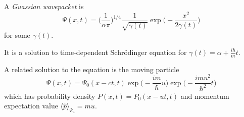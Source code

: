 \documentclass[a4paper]{article}
\theoremstyle{definition}
\begin{document}
\begin{defi}
  A \emph{Guassian wavepacket} is
  \[
    \Psi(x,t) = \Big( \frac{1}{\alpha\pi} \Big)^{1/4}\frac{1}{\sqrt{\gamma(t)}} \exp \Big( -\frac{x^2}{2\gamma(t)} \Big)
  \]
  for some \(\gamma(t)\).
\end{defi}
It is a solution to time-dependent Schr\"odinger equation for \(\gamma(t) = \alpha+\frac{i\hbar}{m}t\).

A related solution to the equation is the moving particle
\[
  \Psi(x,t) = \Psi_0(x-ct,t) \exp \Big(-\frac{im}{\hbar}u \Big) \exp \Big(-\frac{imu^2}{\hbar^2}t \Big)
\]
which has probability density \( P(x,t) = P_0(x-ut,t) \) and momentum expectation value \(\langle \hat p\rangle_{\Psi_u} = mu\).
\end{document}
